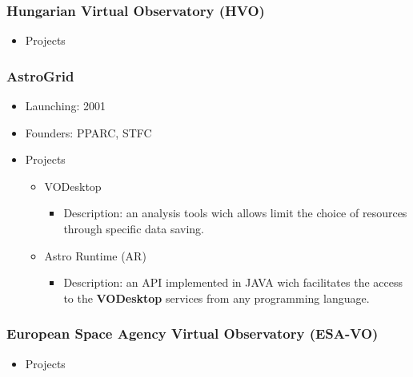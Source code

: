 \documentclass[11pt]{article}
\begin{document}
              \subsubsection{Hungarian Virtual Observatory (HVO)}
                  \begin{itemize}
                      \item Projects
                  \end{itemize}

              \subsubsection{AstroGrid}
                  \begin{itemize}
                      \item Launching: 2001
                      \item Founders: PPARC, STFC
                      \item Projects
                          \begin{itemize}
                              \item VODesktop
                                  \begin{itemize}
                                      \item Description: an analysis tools wich
allows limit the choice of resources through specific data saving.
                                  \end{itemize}
                              \item Astro Runtime (AR)
                                  \begin{itemize}
                                      \item Description: an API implemented in
JAVA wich facilitates the access to the \textbf{VODesktop} services from any
programming language.
                                  \end{itemize}
                          \end{itemize}
                  \end{itemize}

              \subsubsection{European Space Agency Virtual Observatory (ESA-VO)}
                  \begin{itemize}
                      \item Projects
                  \end{itemize}
\end{document}
